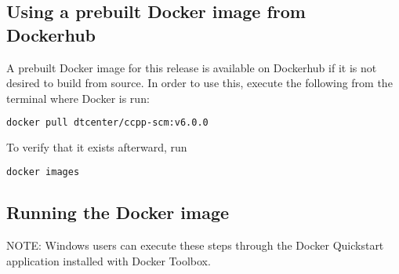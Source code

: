 \subsection{Using a prebuilt Docker image from Dockerhub}

A prebuilt Docker image for this release is available on Dockerhub if it is not desired to build from source. In order to use this, execute the following from the terminal where Docker is run:
\begin{lstlisting}[language=bash]
docker pull dtcenter/ccpp-scm:v6.0.0
\end{lstlisting}
To verify that it exists afterward, run
\begin{lstlisting}[language=bash]
docker images
\end{lstlisting}

\subsection{Running the Docker image}

NOTE: Windows users can execute these steps through the Docker Quickstart application installed with Docker Toolbox.

